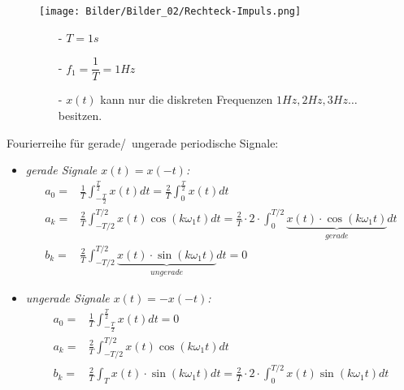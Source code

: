 \begin{figure}[H]
    \centering
    \begin{minipage}{0.55\linewidth}
        \centering
        \texttt{[image: Bilder/Bilder\_02/Rechteck-Impuls.png]}
        \nonumber
    \end{minipage}
    \begin{minipage}{0.4\linewidth}
        \begin{itemize}
            \item[-]
            $T=1s$
            \item[-]
            $f_1=\dfrac{1}{T}=1Hz$
            \item[-]
            $x(t)$ kann nur die diskreten Frequenzen $1Hz, 2Hz, 3Hz \ldots$ besitzen.
        \end{itemize}
    \end{minipage}
\end{figure}

Fourierreihe für gerade/\, ungerade periodische Signale:\\
\begin{itemize}
    \item 
    \textit{gerade Signale $x(t)=x(-t)$:}\\
    \begin{equation}
        \begin{aligned}
        a_0=&\frac{1}{T}\int_{-\frac{T}{2}}^{\frac{T}{2}}x(t)dt=\frac{2}{T}\int_{0}^{\frac{T}{2}}x(t)dt\\
        a_{k}=&\frac{2}{T} \int_{-T / 2}^{T / 2} x(t) \cos (k \omega_{1} t) d t
        =\frac{2}{T} \cdot 2 \cdot \int_{0}^{T / 2} \underbrace{x(t) \cdot \cos( k \omega_{1} t)}_{gerade}dt\\
        b_{k}=&\frac{2}{T} \int_{-T / 2}^{T / 2} \underbrace{x(t) \cdot \sin( k \omega_{1} t)}_{ungerade } d t=0
        \end{aligned}
    \end{equation}
    \item
        \textit{ungerade Signale $x(t)=-x(-t)$:}\\
            \begin{equation}
        \begin{aligned}
        a_{0}=&\frac{1}{T}\int_{-\frac{T}{2}}^{\frac{T}{2}}x(t)dt=0\\
        a_{k}=&\frac{2}{T} \int_{-T / 2}^{T / 2} x(t) \cos (k \omega_{1} t) d t \\
        b_{k}=&\frac{2}{T} \int_{T} x(t) \cdot \sin (k \omega_{1} t )d t=\frac{2}{T} \cdot 2 \cdot \int_{0}^{T / 2} x(t) \sin (k \omega_{1} t )d t
        \end{aligned}
\end{equation}
\end{itemize}


